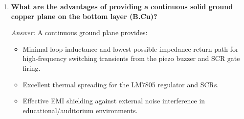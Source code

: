 \documentclass[11pt,a4paper]{article}
\begin{document}
\begin{enumerate}
    \item \textbf{What are the advantages of providing a continuous solid ground copper plane on the bottom layer (B.Cu)?}
    
    \textit{Answer:} A continuous ground plane provides:
    \begin{itemize}
        \item Minimal loop inductance and lowest possible impedance return path for high-frequency switching transients from the piezo buzzer and SCR gate firing.
        \item Excellent thermal spreading for the LM7805 regulator and SCRs.
        \item Effective EMI shielding against external noise interference in educational/auditorium environments.
    \end{itemize}
\end{enumerate}
\end{document}
